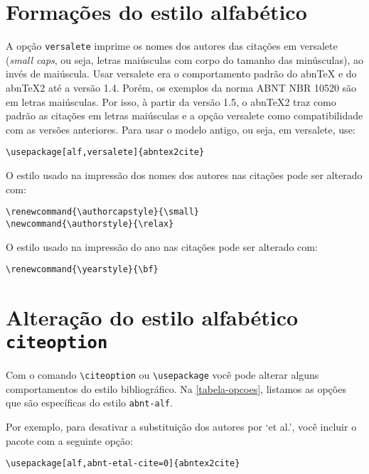 \documentclass[a4paper]{ltxdoc}
\begin{document}
\section{Formações do estilo alfabético}

A opção \texttt{versalete} imprime os nomes dos autores das citações em
versalete (\textit{small caps}, ou seja, letras maiúsculas com corpo do tamanho
das minúsculas), ao invés de maiúscula. Usar versalete era o comportamento
padrão do abnTeX e do abnTeX2 até a versão 1.4. Porém, os exemplos da norma ABNT
NBR 10520 são em letras maiúsculas. Por isso, à partir da versão 1.5, o abnTeX2
traz como padrão as citações em letras maiúsculas e a opção versalete como
compatibilidade com as versões anteriores. Para usar o modelo antigo, ou
seja, em versalete, use:

\begin{verbatim}
\usepackage[alf,versalete]{abntex2cite}
\end{verbatim}

\DescribeMacro{\authorcapstyle}\DescribeMacro{\authorstyle}
O estilo usado na impressão dos nomes dos autores nas citações pode ser alterado
com:

\begin{verbatim}
\renewcommand{\authorcapstyle}{\small}
\newcommand{\authorstyle}{\relax}
\end{verbatim}

\DescribeMacro{\yearstyle}
O estilo usado na impressão do ano nas citações pode ser
alterado com:

\begin{verbatim}
\renewcommand{\yearstyle}{\bf}
\end{verbatim}

\section{Alteração do estilo alfabético \texttt{citeoption}}

\DescribeMacro{\citeoption}
Com o comando \verb+\citeoption+ ou \verb+\usepackage+ você pode alterar alguns comportamentos
do estilo bibliográfico. Na \autoref{tabela-opcoes}, listamos as opções que são
específicas do estilo \texttt{abnt-alf}.

Por exemplo, para desativar a substituição dos autores por `et al.', você
incluir o pacote com a seguinte opção:

\begin{verbatim}
\usepackage[alf,abnt-etal-cite=0]{abntex2cite}
\end{verbatim}
\end{document}
